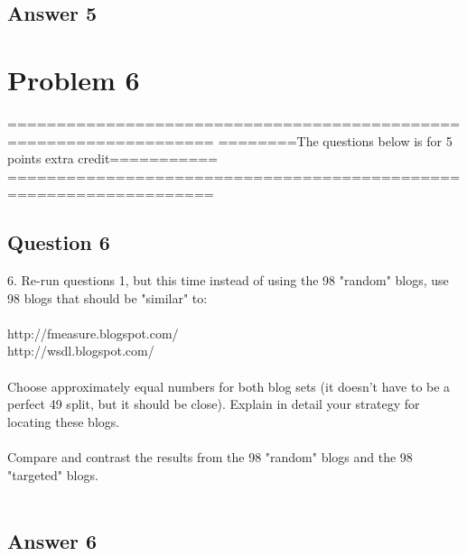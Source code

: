 \documentclass[10pt,letterpaper]{article}
\begin{document}
\subsection{Answer 5}


\pagebreak
\section{Problem 6}
===================================================================
========The questions below is for 5 points extra credit===========
===================================================================
\subsection{Question 6}
6.  Re-run questions 1, but this time instead of using the 98 
"random" blogs, use 98 blogs that should be "similar" to:\\
\\
http://f\-measure.blogspot.com/\\
http://ws\-dl.blogspot.com/\\
\\
Choose approximately equal numbers for both blog sets (it doesn't have to be a perfect 49 split, but it should be close).  Explain in detail your strategy for locating these blogs.\\  
\\
Compare and contrast the results from the 98 "random" blogs and the 98 "targeted" blogs.\\
\\
\subsection{Answer 6}

\pagebreak
\end{document}
